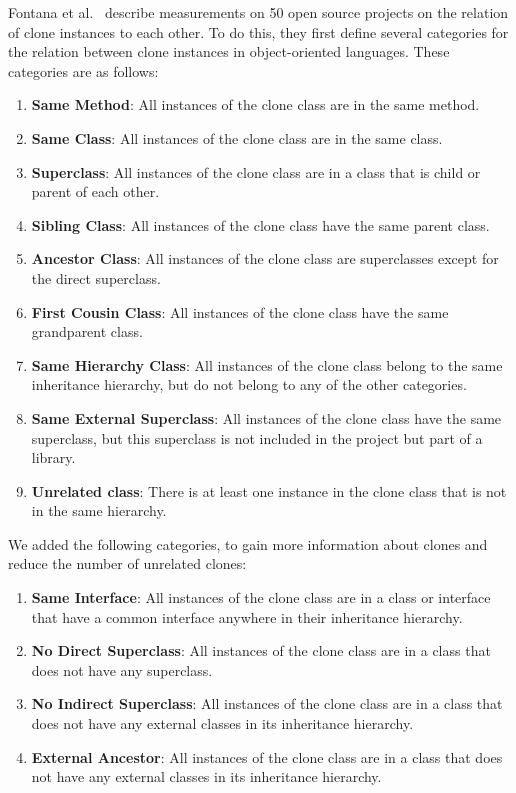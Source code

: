 Fontana et al.~\cite{fontana2015duplicated} describe measurements on 50 open source projects on the relation of clone instances to each other. To do this, they first define several categories for the relation between clone instances in object-oriented languages. These categories are as follows:
\begin{enumerate}
  \item \textbf{Same Method}: All instances of the clone class are in the same method.
  \item \textbf{Same Class}: All instances of the clone class are in the same class.
  \item \textbf{Superclass}: All instances of the clone class are in a class that is child or parent of each other.
  \item \textbf{Sibling Class}: All instances of the clone class have the same parent class.
    \item \textbf{Ancestor Class}: All instances of the clone class are superclasses except for the direct superclass.
  \item \textbf{First Cousin Class}: All instances of the clone class have the same grandparent class.
\item \textbf{Same Hierarchy Class}: All instances of the clone class belong to the same inheritance hierarchy, but do not belong to any of the other categories.
\item \textbf{Same External Superclass}: All instances of the clone class have the same superclass, but this superclass is not included in the project but part of a library.
\item \textbf{Unrelated class}: There is at least one instance in the clone class that is not in the same hierarchy.
\end{enumerate}

We added the following categories, to gain more information about clones and reduce the number of unrelated clones:

\begin{enumerate}
\item \textbf{Same Interface}: All instances of the clone class are in a class or interface that have a common interface anywhere in their inheritance hierarchy.
\item \textbf{No Direct Superclass}: All instances of the clone class are in a class that does not have any superclass.
\item \textbf{No Indirect Superclass}: All instances of the clone class are in a class that does not have any external classes in its inheritance hierarchy.
\item \textbf{External Ancestor}: All instances of the clone class are in a class that does not have any external classes in its inheritance hierarchy.
\end{enumerate}

